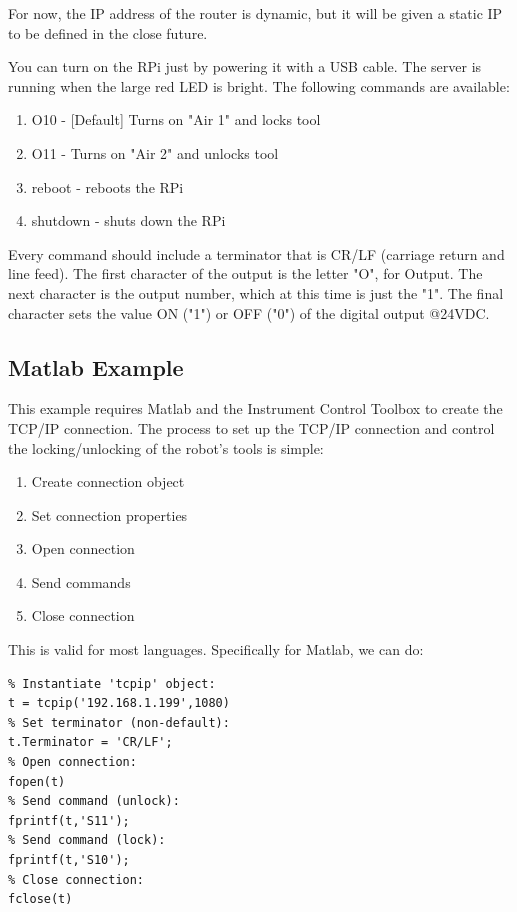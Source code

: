 \documentclass[twoside,a4paper]{refart}
\begin{document}
\attention For now, the IP address of the router is dynamic, but it will be given a static IP to be defined in the close future.

You can turn on the RPi just by powering it with a \mu USB cable. The server is running when the large red LED is bright. The following commands are available:
\begin{enumerate}
	\item
	O10 - [Default] Turns on "Air 1" and locks tool
	\item
	O11 - Turns on "Air 2" and unlocks tool
	\item
	reboot - reboots the RPi
	\item
	shutdown - shuts down the RPi
\end{enumerate}
Every command should include a terminator that is CR/LF (carriage return and line feed). The first character of the output is the letter "O", for Output. The next character is the output number, which at this time is just the "1". The final character sets the value ON ("1") or OFF ("0") of the digital output @24VDC. 

\subsection{Matlab Example}
This example requires Matlab and the Instrument Control Toolbox to create the TCP/IP connection.
The process to set up the TCP/IP connection and control the locking/unlocking of the robot's tools is simple:
\begin{enumerate}
	\item Create connection object
	\item Set connection properties
	\item Open connection
	\item Send commands
	\item Close connection
\end{enumerate}
This is valid for most languages. Specifically for Matlab, we can do:
\begin{verbatim}
% Instantiate 'tcpip' object:
t = tcpip('192.168.1.199',1080)
% Set terminator (non-default):
t.Terminator = 'CR/LF';
% Open connection:
fopen(t)
% Send command (unlock):
fprintf(t,'S11');
% Send command (lock):
fprintf(t,'S10');
% Close connection:
fclose(t)
\end{verbatim}
\end{document}
